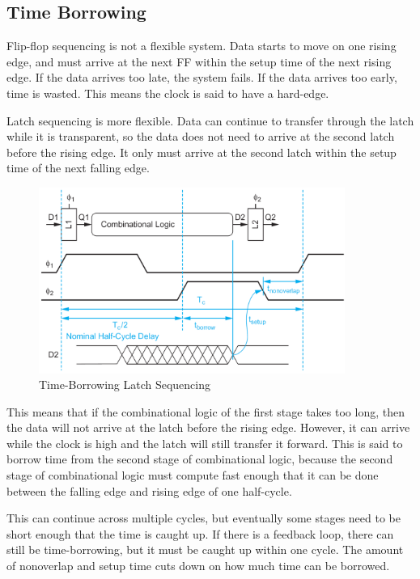 \documentclass{article}
\begin{document}
\subsection{Time Borrowing}

Flip-flop sequencing is not a flexible system. Data starts to move on one rising edge, and must arrive at the next FF within the setup time of the next rising edge. If the data arrives too late, the system fails. If the data arrives too early, time is wasted. This means the clock is said to have a hard-edge. 

Latch sequencing is more flexible. Data can continue to transfer through the latch while it is transparent, so the data does not need to arrive at the second latch before the rising edge. It only must arrive at the second latch within the setup time of the next falling edge. 


\begin{figure}[ht!]
\centering
\includegraphics[width=100mm]{Borrowing.png}
\caption{Time-Borrowing Latch Sequencing}
\end{figure}


This means that if the combinational logic of the first stage takes too long, then the data will not arrive at the latch before the rising edge. However, it can arrive while the clock is high and the latch will still transfer it forward. This is said to borrow time from the second stage of combinational logic, because the second stage of combinational logic must compute fast enough that it can be done between the falling edge and rising edge of one half-cycle. 

This can continue across multiple cycles, but eventually some stages need to be short enough that the time is caught up. If there is a feedback loop, there can still be time-borrowing, but it must be caught up within one cycle. The amount of nonoverlap and setup time cuts down on how much time can be borrowed. 
\end{document}
